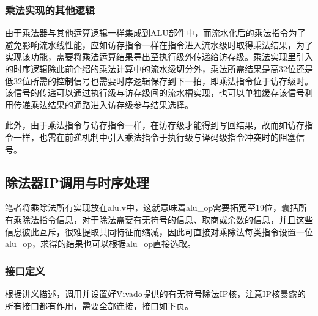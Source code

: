 \documentclass[UTF-8,twoside,c5size]{ctexart}
\begin{document}
	\subsubsection{乘法实现的其他逻辑}
	
	由于乘法器与其他运算逻辑一样集成到ALU部件中，而流水化后的乘法指令为了避免影响流水线性能，应如访存指令一样在指令进入流水级时取得乘法结果，为了实现该功能，需要将乘法运算结果导出至执行级外传递给访存级。乘法实现里引入的时序逻辑除此前介绍的乘法计算中的流水级切分外，乘法所需结果是高32位还是低32位所需的控制信号也需要时序逻辑保存到下一拍，即乘法指令位于访存级时。该信号的传递可以通过执行级与访存级间的流水槽实现，也可以单独缓存该信号利用传递乘法结果的通路进入访存级参与结果选择。
	
	此外，由于乘法指令与访存指令一样，在访存级才能得到写回结果，故而如访存指令一样，也需在前递机制中引入乘法指令于执行级与译码级指令冲突时的阻塞信号。
	
	\subsection{除法器IP调用与时序处理}
	
	笔者将乘除法所有实现放在alu.v中，这就意味着alu\_op需要拓宽至19位，囊括所有乘除法指令信息，对于除法需要有无符号的信息、取商或余数的信息，并且这些信息彼此互斥，很难提取共同特征而缩减，因此可直接对乘除法每类指令设置一位alu\_op，求得的结果也可以根据alu\_op直接选取。
	
	\subsubsection{接口定义}
	
	根据讲义描述，调用并设置好Vivado提供的有无符号除法IP核，注意IP核暴露的所有接口都有作用，需要全部连接，接口如下页。
	
\end{document}
